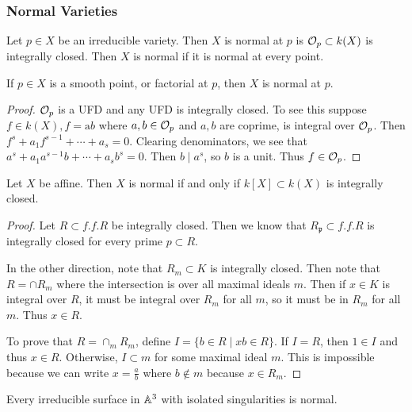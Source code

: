\documentclass[twoside, 10pt]{article}
\begin{document}
    \subsubsection{Normal Varieties} Let $p \in X$ be an irreducible variety.
    Then $X$ is normal at $p$ is $\mathcal{O}_p \subset k(X)$ is integrally closed.
    Then $X$ is normal if it is normal at every point.

    \begin{lem} If $p \in X$ is a smooth point, or factorial at $p$, then $X$
        is normal at $p$.  \begin{proof} $\mathcal{O}_p$ is a UFD and any UFD is
            integrally closed. To see this suppose $f \in k(X), f=
            \mathrm{a}{b}$ where $a,b \in \mathcal{O}_p$ and $a,b$ are coprime, is
            integral over $\mathcal{O}_p$. Then $f^s + a_1 f^{s-1} + \cdots + a_s =
            0$. Clearing denominators, we see that $a^s + a_1a^{s-1}b + \cdots
            + a_sb^s = 0$. Then $b \mid a^s$, so $b$ is a unit. Thus $f \in
        \mathcal{O}_p$.  \end{proof} \end{lem}

    \begin{lem} Let $X$ be affine. Then $X$ is normal if and only if $k[X]
        \subset k(X)$ is integrally closed.  \begin{proof} Let $R \subset
            f.f.R$ be integrally closed. Then we know that $R_{\mathfrak{p}}
            \subset f.f.R$ is integrally closed for every prime $p \subset R$.

            In the other direction, note that $R_m \subset K$ is integrally
            closed. Then note that $R = \cap R_m$ where the intersection is
            over all maximal ideals $m$. Then if $x \in K$ is integral over
            $R$, it must be integral over $R_m$ for all $m$, so it must be in
            $R_m$ for all $m$. Thus $x \in R$.

            To prove that $R = \cap_m R_m$, define $I = \{b \in R \mid xb \in R
            \}$. If $I=R$, then $1 \in I$ and thus $x \in R$. Otherwise, $I
            \subset m$ for some maximal ideal $m$. This is impossible because
            we can write $x=\frac{a}{b}$ where $b \notin m$ because $x \in
        R_m$.  \end{proof} \end{lem}

    \begin{rmk} Every irreducible surface in $\mathbb{A}^3$ with isolated singularities
    is normal.  \end{rmk}
\end{document}
